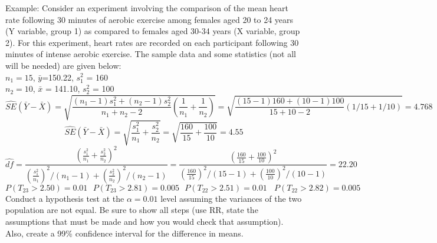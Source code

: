 Example: Consider an experiment involving the comparison of the mean heart rate following 30 minutes of aerobic exercise among females aged 20 to 24 years (Y variable, group 1) as compared to females aged 30-34 years (X variable, group 2). For this experiment, heart rates are recorded on each participant following 30 minutes of intense aerobic exercise.  The sample data and some statistics (not all will be needed) are given below:\\
$n_1 = 15$, $\bar{y}$=150.22, $s^2_1$ = 160\\
$n_2 = 10$, $\bar{x}$ = 141.10, $s^2_2$ = 100\\
$$\widehat{SE}\left(\bar{Y}-\bar{X}\right)=\sqrt{\frac{(n_1-1)s_1^2+(n_2-1)s_2^2}{n_1+n_2-2}\left(\frac{1}{n_1}+\frac{1}{n_2}\right)}=\sqrt{\frac{(15-1)160+(10-1)100}{15+10-2}\left(1/15+1/10\right)}=4.768$$
$$\widehat{SE}\left(\bar{Y}-\bar{X}\right)=\sqrt{\frac{s_1^2}{n_1}+\frac{s_2^2}{n_2}} = \sqrt{\frac{160}{15}+\frac{100}{10}} = 4.55$$
$$\widehat{df} = \frac{\left(\frac{s_1^2}{n_1}+\frac{s_2^2}{n_2}\right)^2}{\left(\frac{s_1^2}{n_1}\right)^2/(n_1-1)+\left(\frac{s_2^2}{n_2}\right)^2/(n_2-1)}=\frac{\left(\frac{160}{15}+\frac{100}{10}\right)^2}{\left(\frac{160}{15}\right)^2/(15-1)+\left(\frac{100}{10}\right)^2/(10-1)}=22.20$$
$$P(T_{23}>2.50)=0.01~~~P(T_{23}>2.81)=0.005~~~P(T_{22}>2.51)=0.01~~~~P(T_{22}>2.82)=0.005$$
Conduct a hypothesis test at the $\alpha=0.01$ level assuming the variances of the two population are not equal.  Be sure to show all steps (use RR, state the assumptions that must be made and how you would check that assumption). Also, create a 99\% confidence interval for the difference in means.

\newpage

